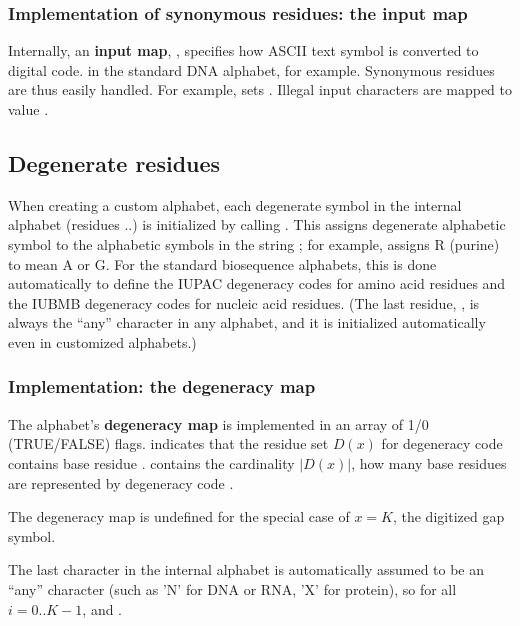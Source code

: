 \subsubsection{Implementation of synonymous residues: the input map}

Internally, an \textbf{input map}, , specifies
how ASCII text symbol is converted to digital
code.  in the standard DNA alphabet, for
example. Synonymous residues are thus easily handled. For example,
 sets
. Illegal input characters are
mapped to value .


\subsection{Degenerate residues}

When creating a custom alphabet, each degenerate symbol in the
internal alphabet (residues ..) is initialized
by calling . This assigns degenerate alphabetic symbol  to the
alphabetic symbols in the string ; for example,
 assigns R
(purine) to mean A or G.  For the standard biosequence alphabets, this
is done automatically to define the IUPAC degeneracy codes for amino
acid residues and the IUBMB degeneracy codes for nucleic acid
residues.  (The last residue, , is always the ``any''
character in any alphabet, and it is initialized automatically even in
customized alphabets.)

\subsubsection{Implementation: the degeneracy map}

The alphabet's \textbf{degeneracy map} is implemented in an array
 of 1/0 (TRUE/FALSE) flags.
 indicates that the residue set $D(x)$
for degeneracy code  contains base residue .
 contains the cardinality $|D(x)|$, how many base
residues are represented by degeneracy code .

The degeneracy map is undefined for the special case of $x=K$, the
digitized gap symbol.

The last character in the internal alphabet is automatically assumed
to be an ``any'' character (such as 'N' for DNA or RNA, 'X' for
protein), so  for all $i=0..K-1$, and
.

